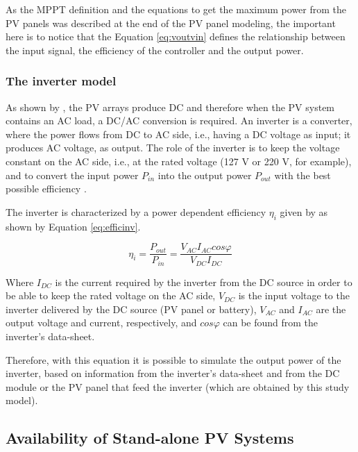 As the MPPT definition and the equations to get the maximum power from the PV panels was described at the end of the PV panel modeling, the important here is to notice that the Equation \ref{eq:voutvin} defines the relationship between the input signal, the efficiency of the controller and the output power.
 
\subsubsection{The inverter model}
As shown by \cite{Mellit}, the PV arrays produce DC and therefore when the PV system contains an AC load, a DC/AC conversion is required. An inverter is a converter, where the power flows from DC to AC side, i.e., having a DC voltage as input; it produces AC voltage, as output. The role of the inverter is to keep the voltage constant on the AC side, i.e., at the rated voltage (127 V or 220 V, for example), and to convert the input power $ P_{in} $ into the output power $ P_{out} $ with the best possible efficiency \cite{Hansen}.

The inverter is characterized by a power dependent efficiency $ \eta_{i} $ given by \cite{Hansen} as shown by Equation \ref{eq:efficinv}.

\begin{equation}
\label{eq:efficinv}
\eta_{i} = \dfrac{P_{out}}{P_{in}} = \dfrac{V_{AC} I_{AC} cos\varphi}{V_{DC}I_{DC}}
\end{equation}

Where $ I_{DC} $ is the current required by the inverter from the DC source in order to be able to keep the rated voltage on the AC side, $ V_{DC} $ is the input voltage to the inverter delivered by the DC source (PV panel or battery),  $ V_{AC}  $ and $ I_{AC} $ are the output voltage and current, respectively, and $ cos \varphi $ can be found from the inverter's data-sheet.

Therefore, with this equation it is possible to simulate the output power of the inverter, based on information from the inverter's data-sheet and from the DC module or the PV panel that feed the inverter (which are obtained by this study model).

\subsection{Availability of Stand-alone PV Systems}
\label{sec:availability}

